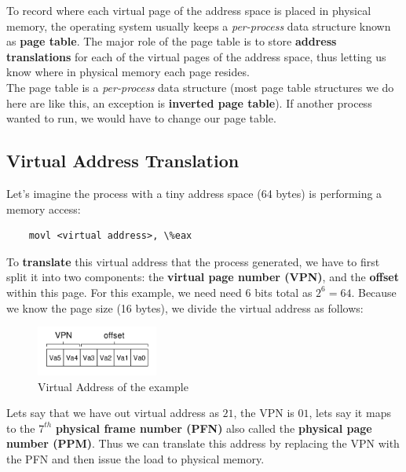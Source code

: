 To record where each virtual page of the address space is placed in physical 
memory, the operating system usually keeps a \textit{per-process} data 
structure known as \textbf{page table}. The major role of the page table is
to store \textbf{address translations} for each of the virtual pages of the
address space, thus letting us know where in physical memory each page
resides.\\

The page table is a \textit{per-process} data structure (most page table
structures we do here are like this, an exception is \textbf{inverted page
table}). If another process wanted to run, we would have to change our page
table.\\

\subsection{Virtual Address Translation}

Let's imagine the process with a tiny address space (64 bytes) is performing
a memory access:

\begin{lstlisting}
    movl <virtual address>, \%eax
\end{lstlisting}

To \textbf{translate} this virtual address that the process generated, we have
to first split it into two components: the \textbf{virtual page number (VPN)},
and the \textbf{offset} within this page. For this example, we need need 6 bits
total as $2^6 = 64$. Because we know the page size (16 bytes), we divide the
virtual address as follows:

\begin{figure}[h!]
    \begin{center}
        \includegraphics[width=4cm]{img/vapage.png}
        \caption{Virtual Address of the example}
    \end{center}
\end{figure}

Lets say that we have out virtual address as $21$, the VPN is $01$,
lets say it maps to the
$7^{th}$ \textbf{physical frame number (PFN)} also called the \textbf{physical
page number (PPM)}. Thus we can translate this address by replacing the VPN
with the PFN and then issue the load to physical memory.

